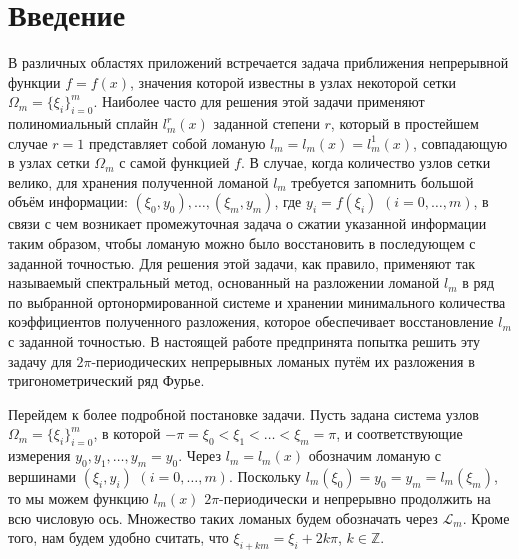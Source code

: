 \section{Введение}
В различных областях приложений встречается задача приближения непрерывной функции $f = f(x)
$, значения которой известны в узлах некоторой сетки $\Omega_m = \{\xi_i\}_{i=0}^{m}$.
Наиболее часто для решения этой задачи применяют полиномиальный сплайн $l_m^r(x)$ заданной степени $r$, который в простейшем случае $r = 1$ представляет собой ломаную $l_m = l_m(x) = l_m^1(x)$, совпадающую в узлах сетки $\Omega_m$ с самой функцией $f$. В случае, когда количество узлов сетки велико, для хранения полученной ломаной $l_m$ требуется запомнить большой объём информации: $(\xi_0, y_0), \ldots, (\xi_m, y_m)$, где $y_i = f(\xi_i)$ $(i = 0, \ldots, m)$, в связи с чем возникает промежуточная задача о сжатии указанной информации таким образом, чтобы ломаную можно было восстановить в последующем с заданной точностью. Для решения этой задачи, как правило, применяют так называемый спектральный метод, основанный на разложении ломаной $l_m$ в ряд по выбранной ортонормированной системе и хранении минимального количества коэффициентов полученного разложения, которое обеспечивает восстановление $l_m$ с заданной точностью. В настоящей работе предпринята попытка решить эту задачу для $2\pi$-периодических непрерывных ломаных путём их разложения в тригонометрический ряд Фурье.

Перейдем к более подробной постановке задачи. Пусть задана система узлов $\Omega_m = \{\xi_i\}_{i=0}^{m}$, в которой
 $-\pi = \xi_0 < \xi_1 < \ldots < \xi_m = \pi$, и соответствующие измерения $y_0, y_1, \ldots, y_m = y_0$. Через $l_m = l_m(x)$ обозначим ломаную с вершинами $(\xi_i, y_i)$ $(i = 0, \ldots, m)$. Поскольку $l_m(\xi_0) = y_0 = y_m =  l_m(\xi_m)$, то мы можем функцию $l_m(x)$ $2\pi$-периодически и непрерывно продолжить на всю числовую ось. Множество таких ломаных будем обозначать через $\mathcal{L}_m$. Кроме того, нам будем удобно считать, что $\xi_{i+km} = \xi_i + 2k\pi$, $k \in \mathbb{Z}$.

